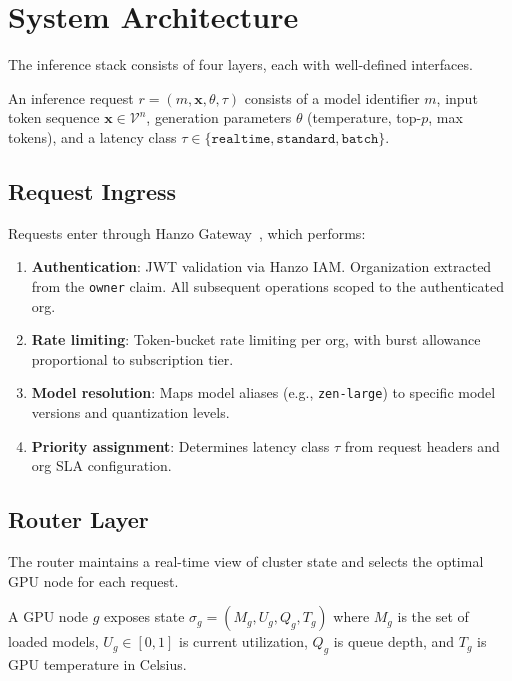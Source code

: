 \section{System Architecture}

\label{sec:arch}

The inference stack consists of four layers, each with well-defined interfaces.

\begin{definition}
An inference request $r = (m, \mathbf{x}, \theta, \tau)$ consists of a model
identifier $m$, input token sequence $\mathbf{x} \in \mathcal{V}^n$,
generation parameters $\theta$ (temperature, top-$p$, max tokens), and a
latency class $\tau \in \{\texttt{realtime}, \texttt{standard}, \texttt{batch}\}$.
\end{definition}

\subsection{Request Ingress}

Requests enter through Hanzo Gateway~\cite{hanzogateway}, which performs:
\begin{enumerate}[leftmargin=1.4em]
    \item \textbf{Authentication}: JWT validation via Hanzo IAM. Organization
    extracted from the \texttt{owner} claim. All subsequent operations scoped
    to the authenticated org.
    \item \textbf{Rate limiting}: Token-bucket rate limiting per org, with burst
    allowance proportional to subscription tier.
    \item \textbf{Model resolution}: Maps model aliases (e.g.,
    \texttt{zen-large}) to specific model versions and quantization levels.
    \item \textbf{Priority assignment}: Determines latency class $\tau$ from
    request headers and org SLA configuration.
\end{enumerate}

\subsection{Router Layer}

The router maintains a real-time view of cluster state and selects the optimal
GPU node for each request.

\begin{definition}
A GPU node $g$ exposes state $\sigma_g = (M_g, U_g, Q_g, T_g)$ where $M_g$ is
the set of loaded models, $U_g \in [0,1]$ is current utilization, $Q_g$ is
queue depth, and $T_g$ is GPU temperature in Celsius.
\end{definition}

